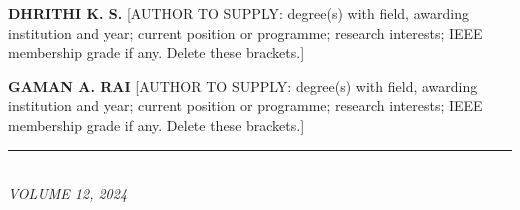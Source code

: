 \documentclass[10pt,twocolumn]{article}
\begin{document}
{\vspace{8pt}
\noindent\begin{minipage}[t]{1.0in}\vspace{0pt}%
\end{minipage}\hfill
\begin{minipage}[t]{\dimexpr\columnwidth-1.1in\relax}\vspace{0pt}%
\textbf{DHRITHI K. S.} [AUTHOR TO SUPPLY: degree(s) with field, awarding institution and year; current position or programme; research interests; IEEE membership grade if any. Delete these brackets.]
\end{minipage}

\vspace{8pt}
\noindent\begin{minipage}[t]{1.0in}\vspace{0pt}%
\end{minipage}\hfill
\begin{minipage}[t]{\dimexpr\columnwidth-1.1in\relax}\vspace{0pt}%
\textbf{GAMAN A. RAI} [AUTHOR TO SUPPLY: degree(s) with field, awarding institution and year; current position or programme; research interests; IEEE membership grade if any. Delete these brackets.]
\end{minipage}

\vspace{6pt}
\noindent\rule{\columnwidth}{0.4pt}\\
{\fontsize{7}{8.5}\selectfont\itshape VOLUME 12, 2024\hfill}
}
\end{document}
